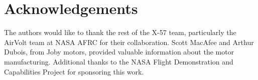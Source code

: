 \documentclass[]{aiaa-tc}%
\begin{document}
\section{Acknowledgements}

The authors would like to thank the rest of the X-57 team, particularly the AirVolt team at NASA AFRC for their collaboration. Scott MacAfee and Arthur Dubois, from Joby motors, provided valuable information about the motor manufacturing. Additional thanks to the NASA Flight Demonstration and Capabilities Project for sponsoring this work.




\end{document}
